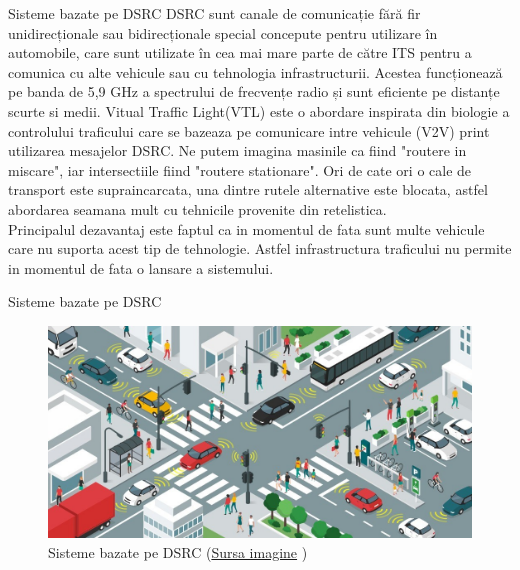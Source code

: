 \documentclass{beamer}
\begin{document}
    \begin{frame}{Sisteme bazate pe DSRC}
        DSRC sunt canale de comunicație fără fir unidirecționale sau
        bidirecționale special concepute pentru utilizare în automobile,
        care sunt utilizate în cea mai mare parte de către ITS pentru a
        comunica cu alte vehicule sau cu tehnologia infrastructurii.
        Acestea funcționează pe banda de 5,9 GHz a spectrului de frecvențe
        radio și sunt eficiente pe distanțe scurte si medii.
        Vitual Traffic Light(VTL) este o abordare inspirata din biologie 
        a controlului traficului care se bazeaza pe comunicare intre 
        vehicule (V2V) print utilizarea mesajelor DSRC.
        Ne putem imagina masinile ca fiind "routere in miscare", iar 
        intersectiile fiind "routere stationare". Ori de cate ori o 
        cale de transport este supraincarcata, una dintre rutele alternative 
        este blocata, astfel abordarea seamana mult cu tehnicile provenite 
        din retelistica.\\
        Principalul dezavantaj este faptul ca in momentul de fata sunt 
        multe vehicule care nu suporta acest tip de tehnologie. Astfel 
        infrastructura traficului nu permite in momentul de fata o lansare 
        a sistemului.
    \end{frame}

    \begin{frame}{Sisteme bazate pe DSRC}
        \begin{figure}[h!]
            \includegraphics[width=\textwidth]{DSRCSystemModel.jpg}
            \caption{Sisteme bazate pe DSRC 
            (\href{https://www.frost.com/frost-perspectives/what-is-required-for-a-scalable-and-industry-wide-vehicle-to-everything-v2x-deployment/}{Sursa imagine} \textcopyright)}
            \label{fig:DSRCSystemModel}
        \end{figure}
        
    \end{frame}
\end{document}
